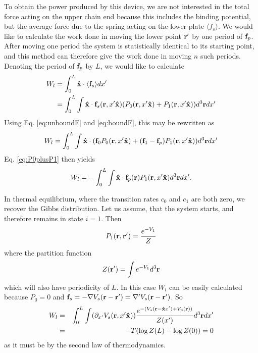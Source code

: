 \documentclass[journal = mamobx, manuscript = article]{achemso}
\def\br{{\bf r}}
\def\bof{{\bf f}}
\def\xhat{{\bf\hat x}}
\begin{document}
To obtain the power produced by this device, we are not interested in the total
force acting on the upper chain end because this includes the binding potential, but the
average force due to the spring acting on the lower plate $\langle f_s\rangle$. We would like
to calculate the work done in moving the lower point $\br'$ by one period of
$\bof_p$. After moving one period the system is statistically identical to its
starting point, and this method can therefore give the work done in moving $n$
such periods. Denoting the period of $\bof_p$ by $L$, we would like to calculate
\begin{align}
\label{eq:defnWL}
W_l &= \int_0^L \xhat\cdot \langle \bof_s\rangle dx' \nonumber\\
      &= \int_0^L \int \xhat\cdot \bof_s(\br,x'\xhat)(P_0(\br,x'\xhat)+P_1(\br,x'\xhat))d^3\br dx'
\end{align}
Using Eq. \ref{eq:unboundF} and \ref{eq:boundF}, this may be rewritten as
\begin{equation}
W_l = \int_0^L \int \xhat\cdot(\bof_0P_0(\br,x'\xhat)+(\bof_1 - \bof_p)P_1(\br,x'\xhat))d^3\br dx'
\end{equation} 
Eq. \ref{eq:P0plusP1} then yields
\begin{equation}
\label{eq:WL}
W_l = -\int_0^L \int \xhat\cdot \bof_p(\br)P_1(\br,x'\xhat)d^3\br dx' .
\end{equation}

In thermal equilibrium, where the transition rates $c_0$ and $c_1$ are both zero, 
we recover the Gibbs distribution. Let us assume, that the system starts, and
therefore remains in state $i=1$. Then
\begin{equation}
P_1(\br, \br') = \frac{e^{-V_1}}{Z}
\end{equation}
where the partition function 
\begin{equation}
Z(\br') = \int e^{-V_1} d^3\br 
\end{equation}
which will also have periodicity of $L$.
In this case $W_l$ can be easily calculated because $P_0 =0$ and $\bof_s = -\nabla
V_s(\br-\br') = \nabla'V_s(\br-\br')$. So 
\begin{eqnarray}
\label{eq:Weq0}
W_l &=& \int_0^L \int (\partial_{x'}V_s(\br,x'\xhat)) \frac{e^{-(V_s(\br-\xhat x')+V_p(\br))}}{Z(x')} d^3\br dx'\nonumber\\
    &=& -T (\log Z(L) - \log Z(0)) = 0
\end{eqnarray}
as it must be by the second law of thermodynamics.
\end{document}
